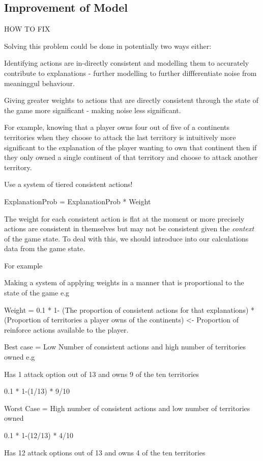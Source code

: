 \documentclass[parskip]{cs4rep}
\begin{document}
\subsection{Improvement of Model}

HOW TO FIX

Solving this problem could be done in potentially two ways either:

Identifying actions are in-directly consistent and modelling them to accurately contribute to explanations - further modelling to further diffferentiate noise from meaninggul behaviour.
 
Giving greater weights to actions that are directly consistent through the state of the game  more significant - making noise less significant.

For example, knowing that a player owns four out of five of a continents territories when they choose to attack the last territory is intuitively more significant to the explanation of the player wanting to own that continent then if they only owned a single continent of that territory and choose to attack another territory.

Use a system of tiered consistent actions!

ExplanationProb = ExplanationProb * Weight

The weight for each consistent action is flat at the moment or more precisely actions are consistent in themselves but may not be consistent given the \textit{context} of the game state. To deal with this, we should introduce into our calculations data from the game state.

For example

Making a system of applying weights in a manner that is proportional to the state of the game e.g

Weight = 0.1 * 1- (The proportion of consistent actions for that explanations) * (Proportion of territories a player owns of the continents) <- Proportion of reinforce actions available to the player.

Best case = Low Number of consistent actions and high number of territories owned e.g

Has 1 attack option out of 13 and owns 9 of the ten territories

0.1 * 1-(1/13) * 9/10 

Worst Case = High number of consistent actions and low number of territories owned

0.1 * 1-(12/13) * 4/10 

Has 12 attack options out of 13 and owns 4 of the ten territories
\end{document}
